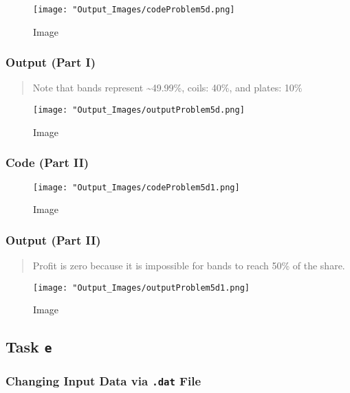 \documentclass[
  12pt,
]{article}
\begin{document}
\begin{figure}
\centering
\texttt{[image: "Output\_Images/codeProblem5d.png]}
\caption{Image}
\end{figure}

\hypertarget{output-part-i}{%
\subsubsection{Output (Part I)}\label{output-part-i}}

\begin{quote}
Note that bands represent \textasciitilde49.99\%, coils: 40\%, and
plates: 10\%
\end{quote}

\begin{figure}
\centering
\texttt{[image: "Output\_Images/outputProblem5d.png]}
\caption{Image}
\end{figure}

\hypertarget{code-part-ii}{%
\subsubsection{Code (Part II)}\label{code-part-ii}}

\begin{figure}
\centering
\texttt{[image: "Output\_Images/codeProblem5d1.png]}
\caption{Image}
\end{figure}

\hypertarget{output-part-ii}{%
\subsubsection{Output (Part II)}\label{output-part-ii}}

\begin{quote}
Profit is zero because it is impossible for bands to reach 50\% of the
share.
\end{quote}

\begin{figure}
\centering
\texttt{[image: "Output\_Images/outputProblem5d1.png]}
\caption{Image}
\end{figure}

\hypertarget{task-e}{%
\subsection{\texorpdfstring{Task \texttt{e}}{Task e}}\label{task-e}}

\hypertarget{changing-input-data-via-.dat-file}{%
\subsubsection{\texorpdfstring{Changing Input Data via \texttt{.dat}
File}{Changing Input Data via .dat File}}\label{changing-input-data-via-.dat-file}}
\end{document}
